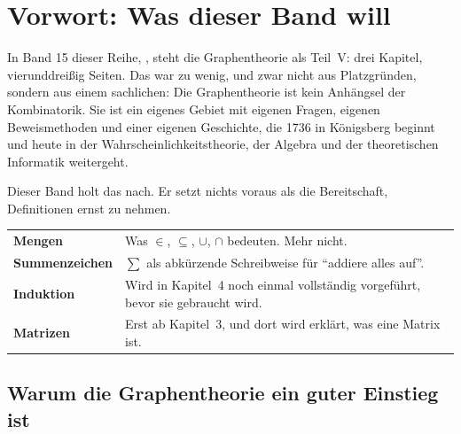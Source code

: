 \chapter*{Vorwort: Was dieser Band will}

In Band 15 dieser Reihe, , steht die Graphentheorie als Teil~V: drei Kapitel, vierunddreißig Seiten. Das war zu wenig, und zwar nicht aus Platzgründen, sondern aus einem sachlichen: Die Graphentheorie ist kein Anhängsel der Kombinatorik. Sie ist ein eigenes Gebiet mit eigenen Fragen, eigenen Beweismethoden und einer eigenen Geschichte, die 1736 in Königsberg beginnt und heute in der Wahrscheinlichkeitstheorie, der Algebra und der theoretischen Informatik weitergeht.

Dieser Band holt das nach. Er setzt nichts voraus als die Bereitschaft, Definitionen ernst zu nehmen.

\begin{merksatz}
\begin{center}
\renewcommand{\arraystretch}{1.5}
\begin{tabular}{@{}P{3.2cm}P{5.8cm}@{}}
\toprule
\textbf{Mengen} & Was $\in$, $\subseteq$, $\cup$, $\cap$ bedeuten. Mehr nicht.\\
\textbf{Summenzeichen} & $\sum$ als abkürzende Schreibweise für \enquote{addiere alles auf}.\\
\textbf{Induktion} & Wird in Kapitel~4 noch einmal vollständig vorgeführt, bevor sie gebraucht wird.\\
\textbf{Matrizen} & Erst ab Kapitel~3, und dort wird erklärt, was eine Matrix ist.\\
\bottomrule
\end{tabular}
\end{center}

\begin{center}
\begin{minipage}{0.88\textwidth}
\end{minipage}
\end{center}
\end{merksatz}

\section*{Warum die Graphentheorie ein guter Einstieg ist}

